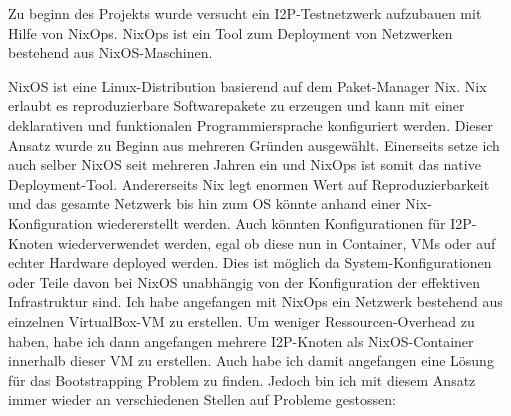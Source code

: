 Zu beginn des Projekts wurde versucht ein I2P-Testnetzwerk aufzubauen mit Hilfe von NixOps.
NixOps ist ein Tool zum Deployment von Netzwerken bestehend aus NixOS-Maschinen.
\cite{noauthor_nixops_nodate-5}

NixOS ist eine Linux-Distribution basierend auf dem Paket-Manager Nix.
Nix erlaubt es reproduzierbare Softwarepakete zu erzeugen und kann mit einer deklarativen und funktionalen Programmiersprache konfiguriert werden.
Dieser Ansatz wurde zu Beginn aus mehreren Gründen ausgewählt.
Einerseits setze ich auch selber NixOS seit mehreren Jahren ein und NixOps ist somit das native Deployment-Tool.
Andererseits Nix legt enormen Wert auf Reproduzierbarkeit und das gesamte Netzwerk bis hin zum OS könnte anhand einer Nix-Konfiguration wiedererstellt werden.
Auch könnten Konfigurationen für I2P-Knoten wiederverwendet werden, egal ob diese nun in Container,
VMs oder auf echter Hardware deployed werden.
Dies ist möglich da System-Konfigurationen oder Teile davon bei NixOS unabhängig von der Konfiguration der effektiven Infrastruktur sind.
Ich habe angefangen mit NixOps ein Netzwerk bestehend aus einzelnen VirtualBox-VM zu erstellen.
Um weniger Ressourcen-Overhead zu haben, habe ich dann angefangen mehrere I2P-Knoten als NixOS-Container innerhalb dieser VM zu erstellen.
Auch habe ich damit angefangen eine Lösung für das Bootstrapping Problem zu finden.
Jedoch bin ich mit diesem Ansatz immer wieder an verschiedenen Stellen auf Probleme gestossen:

